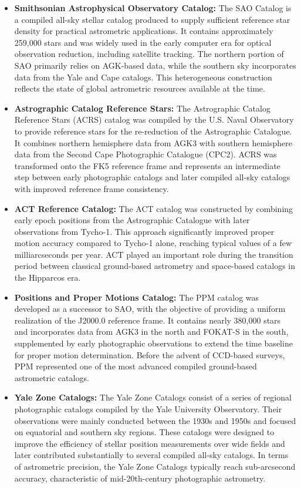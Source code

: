 \documentclass{aastex701}
\begin{document}
\begin{itemize}
    \item \textbf{Smithsonian Astrophysical Observatory Catalog:} \label{subsubsec:sao} The SAO Catalog is a compiled all-sky stellar catalog produced to supply sufficient reference star density for practical astrometric applications. It contains approximately 259,000 stars and was widely used in the early computer era for optical observation reduction, including satellite tracking. The northern portion of SAO primarily relies on AGK-based data, while the southern sky incorporates data from the Yale and Cape catalogs. This heterogeneous construction reflects the state of global astrometric resources available at the time.

    \item \textbf{Astrographic Catalog Reference Stars:} \label{subsubsec:acrs} The Astrographic Catalog Reference Stars (ACRS) catalog was compiled by the U.S. Naval Observatory to provide reference stars for the re-reduction of the Astrographic Catalogue. It combines northern hemisphere data from AGK3 with southern hemisphere data from the Second Cape Photographic Catalogue (CPC2). ACRS was transformed onto the FK5 reference frame and represents an intermediate step between early photographic catalogs and later compiled all-sky catalogs with improved reference frame consistency.

    \item \textbf{ACT Reference Catalog:} \label{subsubsec:act} The ACT catalog was constructed by combining early epoch positions from the Astrographic Catalogue with later observations from Tycho-1. This approach significantly improved proper motion accuracy compared to Tycho-1 alone, reaching typical values of a few milliarcseconds per year. ACT played an important role during the transition period between classical ground-based astrometry and space-based catalogs in the Hipparcos era.

    \item \textbf{Positions and Proper Motions Catalog:} \label{subsubsec:ppm} The PPM catalog was developed as a successor to SAO, with the objective of providing a uniform realization of the J2000.0 reference frame. It contains nearly 380,000 stars and incorporates data from AGK3 in the north and FOKAT-S in the south, supplemented by early photographic observations to extend the time baseline for proper motion determination. Before the advent of CCD-based surveys, PPM represented one of the most advanced compiled ground-based astrometric catalogs.

    \item \textbf{Yale Zone Catalogs:} \label{subsubsec:yale} The Yale Zone Catalogs consist of a series of regional photographic catalogs compiled by the Yale University Observatory. Their observations were mainly conducted between the 1930s and 1950s and focused on equatorial and southern sky regions. These catalogs were designed to improve the efficiency of stellar position measurements over wide fields and later contributed substantially to several compiled all-sky catalogs. In terms of astrometric precision, the Yale Zone Catalogs typically reach sub-arcsecond accuracy, characteristic of mid-20th-century photographic astrometry.


\end{itemize}
\end{document}
